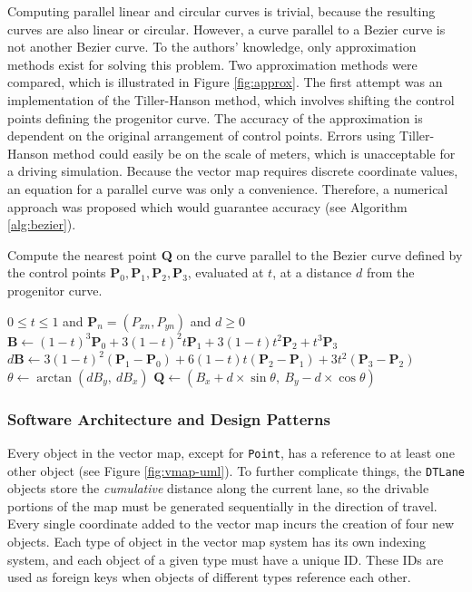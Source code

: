 \documentclass[12pt,twoside]{article}
\begin{document}
Computing parallel linear and circular curves is trivial, because the resulting curves are also linear or circular. However, a curve parallel to a Bezier curve is not another Bezier curve. To the authors' knowledge, only approximation methods exist for solving this problem. Two approximation methods were compared, which is illustrated in Figure \ref{fig:approx}. The first attempt was an implementation of the Tiller-Hanson method, which involves shifting the control points defining the progenitor curve. The accuracy of the approximation is dependent on the original arrangement of control points. Errors using Tiller-Hanson method could easily be on the scale of meters, which is unacceptable for a driving simulation. Because the vector map requires discrete coordinate values, an equation for a parallel curve was only a convenience. Therefore, a numerical approach was proposed which would guarantee accuracy (see Algorithm \ref{alg:bezier}).

\begin{algorithm}
\caption{Compute the nearest point \textbf{Q} on the curve parallel to the Bezier curve defined by the control points $\textbf{P}_0, \textbf{P}_1, \textbf{P}_2, \textbf{P}_3$, evaluated at $t$, at a distance $d$ from the progenitor curve.}
\begin{algorithmic}
\REQUIRE $0 \leq t \leq 1$ and $\textbf{P}_n = (P_{xn}, P_{yn})$ and $d \geq 0$
\STATE $\textbf{B} \leftarrow (1-t)^3\textbf{P}_0+3(1-t)^2t\textbf{P}_1+3(1-t)t^2\textbf{P}_2+t^3\textbf{P}_3$
\STATE $d\textbf{B} \leftarrow 3(1-t)^2(\textbf{P}_1-\textbf{P}_0)+6(1-t)t(\textbf{P}_2-\textbf{P}_1)+3t^2(\textbf{P}_3-\textbf{P}_2)$
\STATE $\theta \leftarrow \arctan(dB_y, ~ dB_x)$
\STATE $\textbf{Q} \leftarrow (B_x + d \times \sin\theta, ~ B_y - d \times \cos\theta)$
\end{algorithmic}
\label{alg:bezier}
\end{algorithm}

\subsubsection{Software Architecture and Design Patterns}

Every object in the vector map, except for \texttt{Point}, has a reference to at least one other object (see Figure \ref{fig:vmap-uml}). To further complicate things, the \texttt{DTLane} objects store the \textit{cumulative} distance along the current lane, so the drivable portions of the map must be generated sequentially in the direction of travel. Every single coordinate added to the vector map incurs the creation of four new objects. Each type of object in the vector map system has its own indexing system, and each object of a given type must have a unique ID. These IDs are used as foreign keys when objects of different types reference each other.
\end{document}
